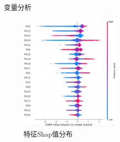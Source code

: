 \begin{frame}[fragile]{变量分析}
    \begin{figure}
        \includegraphics[width=5cm]{Pic/shap_summary.png}
        \caption{特征Shap值分布}
    \end{figure}
\end{frame}
